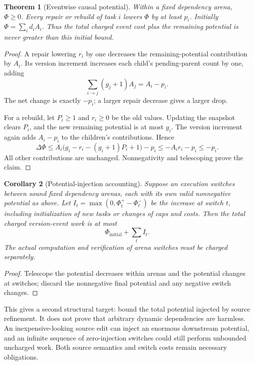 \documentclass[11pt]{article}
\newtheorem{theorem}{Theorem}[section]
\newtheorem{corollary}[theorem]{Corollary}
\theoremstyle{definition}
\begin{document}
\begin{theorem}[Eventwise causal potential]\label{thm:potential}
Within a fixed dependency arena, $\Phi\geq0$. Every repair or rebuild of task $i$ lowers $\Phi$ by at least $p_i$. Initially $\Phi=\sum_i d_iA_i$. Thus the total charged event cost plus the remaining potential is never greater than this initial bound.
\end{theorem}
\begin{proof}
A repair lowering $r_i$ by one decreases the remaining-potential contribution by $A_i$. Its version increment increases each child's pending-parent count by one, adding
\[
 \sum_{i\to j}(g_j+1)A_j=A_i-p_i.
\]
The net change is exactly $-p_i$; a larger repair decrease gives a larger drop.

For a rebuild, let $P_i\geq1$ and $r_i\geq0$ be the old values. Updating the snapshot clears $P_i$, and the new remaining potential is at most $g_i$. The version increment again adds $A_i-p_i$ to the children's contributions. Hence
\[
 \Delta\Phi\leq A_i\bigl(g_i-r_i-(g_i+1)P_i+1\bigr)-p_i
 \leq -A_ir_i-p_i\leq-p_i.
\]
All other contributions are unchanged. Nonnegativity and telescoping prove the claim.
\end{proof}

\begin{corollary}[Potential-injection accounting]\label{cor:injection}
Suppose an execution switches between sound fixed dependency arenas, each with its own valid nonnegative potential as above. Let $I_t=\max(0,\Phi_t^+-\Phi_t^-)$ be the increase at switch $t$, including initialization of new tasks or changes of caps and costs. Then the total charged version-event work is at most
\[
 \Phi_{\mathrm{initial}}+\sum_t I_t.
\]
The actual computation and verification of arena switches must be charged separately.
\end{corollary}
\begin{proof}
Telescope the potential decreases within arenas and the potential changes at switches; discard the nonnegative final potential and any negative switch changes.
\end{proof}
This gives a second structural target: bound the total potential injected by source refinement. It does not prove that arbitrary dynamic dependencies are harmless. An inexpensive-looking source edit can inject an enormous downstream potential, and an infinite sequence of zero-injection switches could still perform unbounded uncharged work. Both source semantics and switch costs remain necessary obligations.
\end{document}
